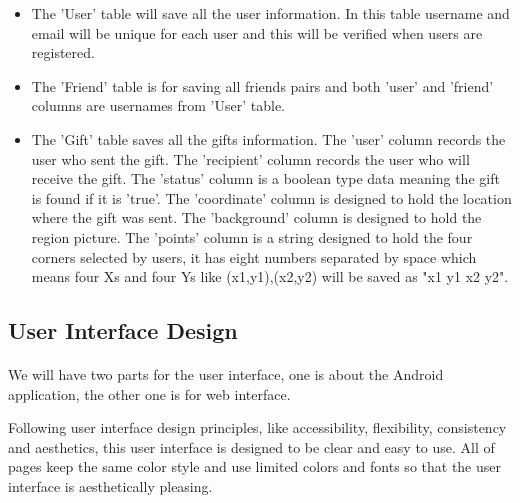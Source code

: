 \begin{itemize}
\item The 'User' table will save all the user information. In this table username and email will be unique for each user and this will be verified when users are registered.
\item The 'Friend' table is for saving all friends pairs and both 'user' and 'friend' columns are usernames from 'User' table.
\item The 'Gift' table saves all the gifts information. The 'user' column records the user who sent the gift. The 'recipient' column records the user who will receive the gift. The 'status' column is a boolean type data meaning the gift is found if it is 'true'. The 'coordinate' column is designed to hold the location where the gift was sent. The 'background' column is designed to hold the region picture. The 'points' column is a string designed to hold the four corners selected by users, it has eight numbers separated by space which means four Xs and four Ys like (x1,y1),(x2,y2) will be saved as "x1 y1 x2 y2".
\end{itemize}

\subsection{User Interface Design}
\paragraph{} We will have two parts for the user interface, one is about the Android application, the other one is for web interface.
\par Following user interface design principles, like accessibility, flexibility, consistency and aesthetics, this user interface is designed to be clear and easy to use. All of pages keep the same color style and use limited colors and fonts so that the user interface is aesthetically pleasing.\cite{galitz2007} 

